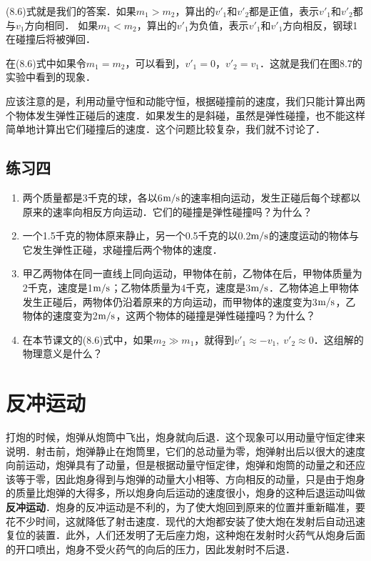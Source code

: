 (8.6)式就是我们的答案．如果$m_1>m_2$，算出的$v'_1$和$v'_2$都是正值，表示$v'_1$和$v'_2$都与$v_1$方向相同．
如果$m_1<m_2$，算出的$v'_1$为负值，表示$v'_1$和$v'_1$方向相反，钢球1在碰撞后将被弹回．

在(8.6)式中如果令$m_1=m_2$，可以看到，$v'_1=0$，$v'_2=v_1$．这就是我们在图8.7的实验中看到的现象．

应该注意的是，利用动量守恒和动能守恒，根据碰撞前的速度，我们只能计算出两个物体发生弹性正碰后的速度．如果发生的是斜碰，虽然是弹性碰撞，也不能这样简单地计算出它们碰撞后的速度．这个问题比较复杂，我们就不讨论了．

\subsection*{练习四}
\begin{enumerate}
\item 两个质量都是3千克的球，各以6$\text{m}/\text{s}$的速率相向运动，发生正碰后每个球都以原来的速率向相反方向运动．它们的碰撞是弹性碰撞吗？为什么？
\item 一个1.5千克的物体原来静止，另一个0.5千克的以0.2$\text{m}/\text{s}$的速度运动的物体与它发生弹性正碰，求碰撞后两个物体的速度．
\item 甲乙两物体在同一直线上同向运动，甲物体在前，乙物体在后，甲物体质量为2千克，速度是1$\text{m}/\text{s}$；乙物体质量为4千克，速度是3$\text{m}/\text{s}$．乙物体追上甲物体发生正碰后，两物体仍沿着原来的方向运动，而甲物体的速度变为3$\text{m}/\text{s}$，乙物体的速度变为2$\text{m}/\text{s}$，这两个物体的碰撞是弹性碰撞吗？为什么？
\item 在本节课文的(8.6)式中，如果$m_2\gg m_1$，就得到$v'_1\approx -v_1,\; v'_2\approx 0$．这组解的物理意义是什么？
\end{enumerate}


\section{反冲运动}
打炮的时候，炮弹从炮筒中飞出，炮身就向后退．这个现象可以用动量守恒定律来说明．射击前，炮弹静止在炮筒里，它们的总动量为零，炮弹射出后以很大的速度向前运动，炮弹具有了动量，但是根据动量守恒定律，炮弹和炮筒的动量之和还应该等于零，因此炮身得到与炮弹的动量大小相等、方向相反的动量，只是由于炮身的质量比炮弹的大得多，所以炮身向后运动的速度很小，炮身的这种后退运动叫做\textbf{反冲运动}．炮身的反冲运动是不利的，为了使大炮回到原来的位置并重新瞄准，要花不少时间，这就降低了射击速度．现代的大炮都安装了使大炮在发射后自动迅速复位的装置．此外，人们还发明了无后座力炮，这种炮在发射时火药气从炮身后面的开口喷出，炮身不受火药气的向后的压力，因此发射时不后退．

